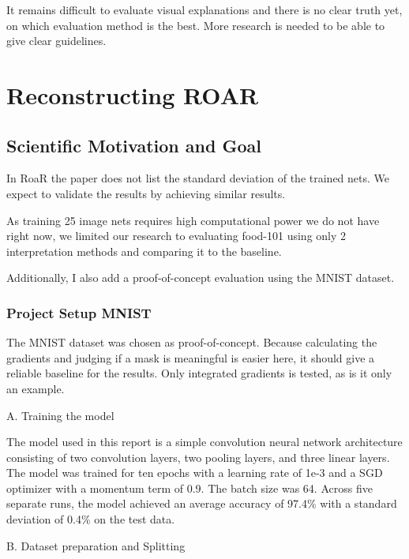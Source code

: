 It remains difficult to evaluate visual explanations and there is no clear truth yet, on which evaluation method is the best. More research is needed to be able to give clear guidelines.




\chapter{Reconstructing ROAR} %
\label{sec:project}



\section{Scientific Motivation and Goal}
In RoaR\cite{hooker2019benchmark} the paper does not list the standard deviation of the trained nets. We expect to validate the results by achieving similar results.

As training 25 image nets requires high computational power we do not have right now, we limited our research to evaluating food-101 \cite{bossard14} using only 2 interpretation methods and comparing it to the baseline.


Additionally, I also add a proof-of-concept evaluation using the MNIST dataset.



\subsection{Project Setup MNIST}

The MNIST dataset \cite{deng2012mnist} was chosen as proof-of-concept. Because calculating the gradients and judging if a mask is meaningful is easier here, it should give a reliable baseline for the results. Only integrated gradients is tested, as is it only an example.

A. Training the model

The model used in this report is a simple convolution neural network architecture consisting of two convolution layers, two pooling layers, and three linear layers. The model was trained for ten epochs with a learning rate of 1e-3 and a SGD optimizer with a momentum term of 0.9. The batch size was 64. Across five separate runs, the model achieved an average accuracy of 97.4\% with a standard deviation of 0.4\% on the test data.

B. Dataset preparation and Splitting

